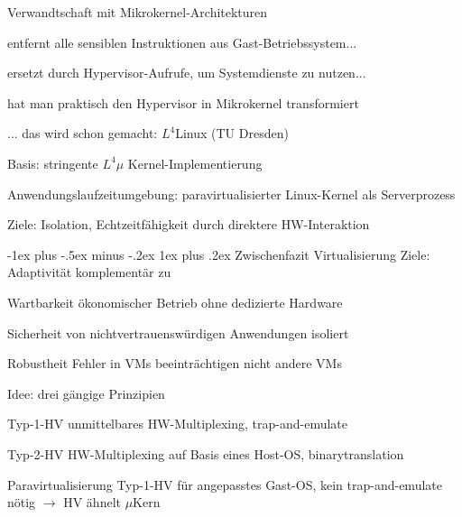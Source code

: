 \documentclass[a4paper]{article}
\makeatletter
\renewcommand{\subsubsection}{\@startsection{subsubsection}{3}{0mm}%
 {-1ex plus -.5ex minus -.2ex}%
 {1ex plus .2ex}%
 {\normalfont\small\bfseries}}
\makeatother
\begin{document}
\begin{multicols}{3}
    Verwandtschaft mit Mikrokernel-Architekturen
    \begin{itemize*}
        \item entfernt alle sensiblen Instruktionen aus Gast-Betriebssystem...
        \item ersetzt durch Hypervisor-Aufrufe, um Systemdienste zu nutzen...
        \item hat man praktisch den Hypervisor in Mikrokernel transformiert
        \item ... das wird schon gemacht: $L^4$Linux (TU Dresden)
        \begin{itemize*}
            \item Basis: stringente $L^4\mu$ Kernel-Implementierung %
            \item Anwendungslaufzeitumgebung: paravirtualisierter Linux-Kernel als Serverprozess
            \item Ziele: Isolation, Echtzeitfähigkeit durch direktere HW-Interaktion %
        \end{itemize*}
    \end{itemize*}

    \subsubsection{Zwischenfazit Virtualisierung}
    Ziele: Adaptivität komplementär zu
    \begin{description*}
        \item[Wartbarkeit] ökonomischer Betrieb ohne dedizierte Hardware
        \item[Sicherheit] von nichtvertrauenswürdigen Anwendungen isoliert
        \item[Robustheit] Fehler in VMs beeinträchtigen nicht andere VMs
    \end{description*}

    Idee: drei gängige Prinzipien
    \begin{description*}
        \item[Typ-1-HV] unmittelbares HW-Multiplexing, trap-and-emulate
        \item[Typ-2-HV] HW-Multiplexing auf Basis eines Host-OS, binarytranslation
        \item[Paravirtualisierung] Typ-1-HV für angepasstes Gast-OS, kein trap-and-emulate nötig $\rightarrow$ HV ähnelt $\mu$Kern
    \end{description*}


\end{multicols}
\end{document}
